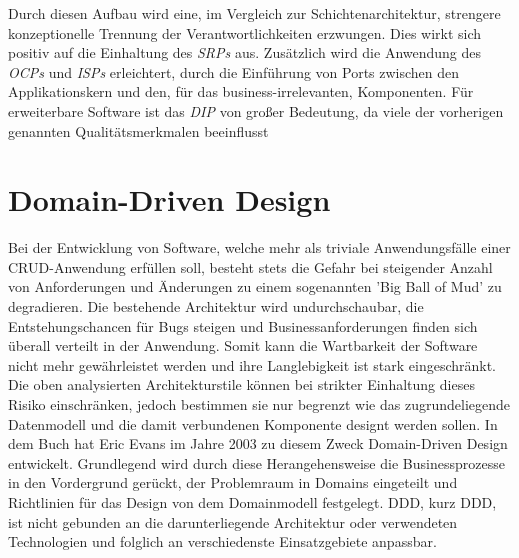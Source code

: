 
Durch diesen Aufbau wird eine, im Vergleich zur Schichtenarchitektur, strengere konzeptionelle Trennung der Verantwortlichkeiten erzwungen. Dies wirkt sich positiv auf die Einhaltung des \emph{\acrlong{SRP}s} aus. Zusätzlich wird die Anwendung des \emph{\acrlong{OCP}s} und \emph{\acrlong{ISP}s} erleichtert, durch die Einführung von Ports zwischen den Applikationskern und den, für das business-irrelevanten, Komponenten. Für erweiterbare Software ist das \emph{\acrlong{DIP}} von großer Bedeutung, da viele der vorherigen genannten Qualitätsmerkmalen beeinflusst 




\section{Domain-Driven Design}

Bei der Entwicklung von Software, welche mehr als triviale Anwendungsfälle einer CRUD-Anwendung erfüllen soll, besteht stets die Gefahr bei steigender Anzahl von Anforderungen und Änderungen zu einem sogenannten 'Big Ball of Mud' zu {\color{red} degradieren}. Die bestehende Architektur wird undurchschaubar, die Entstehungschancen für Bugs steigen und Businessanforderungen finden sich überall verteilt in der Anwendung. Somit kann die Wartbarkeit der Software nicht mehr gewährleistet werden und ihre Langlebigkeit ist stark eingeschränkt. Die oben analysierten Architekturstile können bei strikter Einhaltung dieses Risiko einschränken, jedoch bestimmen sie nur begrenzt wie das zugrundeliegende Datenmodell und die damit verbundenen Komponente designt werden sollen. In dem Buch  hat Eric Evans im Jahre 2003 zu diesem Zweck Domain-Driven Design entwickelt. Grundlegend wird durch diese Herangehensweise die Businessprozesse in den Vordergrund gerückt, der Problemraum in Domains eingeteilt und Richtlinien für das Design von dem Domainmodell festgelegt. \acrlong{DDD}, kurz \acrshort{DDD}, ist nicht gebunden an die darunterliegende Architektur oder verwendeten Technologien und folglich an verschiedenste Einsatzgebiete anpassbar.

